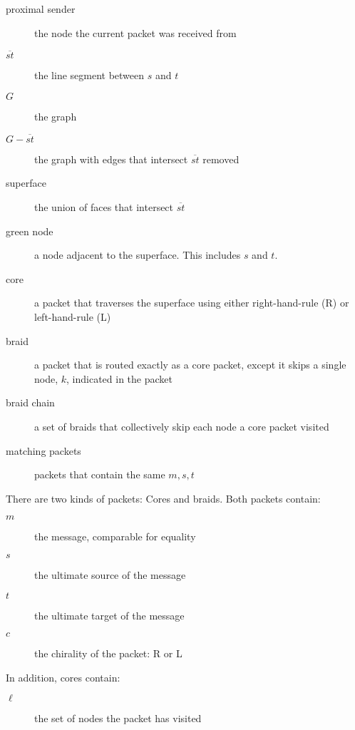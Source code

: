 \documentclass{llncs}
\begin{document}
\begin{description}
  \item[ proximal sender ] the node the current packet was received from
  \item[ \(\overline{st}\) ] the line segment between \(s\) and \(t\)
  \item[ \(G\) ] the graph
  \item[ \(G-\overline{st}\) ] the graph with edges that intersect \(\overline{st}\) removed
  \item[ superface ] the union of faces that intersect \(\overline{st}\)
  \item[ green node ] a node adjacent to the superface. This includes \(s\) and \(t\).
  \item[ core ] a packet that traverses the superface using either right-hand-rule (R) or left-hand-rule (L)
  \item[ braid ] a packet that is routed exactly as a core packet, except it skips a single node, \(k\), indicated in the packet
  \item[ braid chain ] a set of braids that collectively skip each node a core packet visited
  \item[ matching packets ] packets that contain the same \(m, s, t\)
\end{description}

There are two kinds of packets: Cores and braids. Both packets contain:
\begin{description}
  \item[ \(m\) ] the message, comparable for equality
  \item[ \(s\) ] the ultimate source of the message
  \item[ \(t\) ] the ultimate target of the message
  \item[ \(c\) ] the chirality of the packet: R or L
\end{description}

\noindent
In addition, cores contain:
\begin{description}
  \item[ \(\ell\) ] the set of nodes the packet has visited
\end{description}
\end{document}
